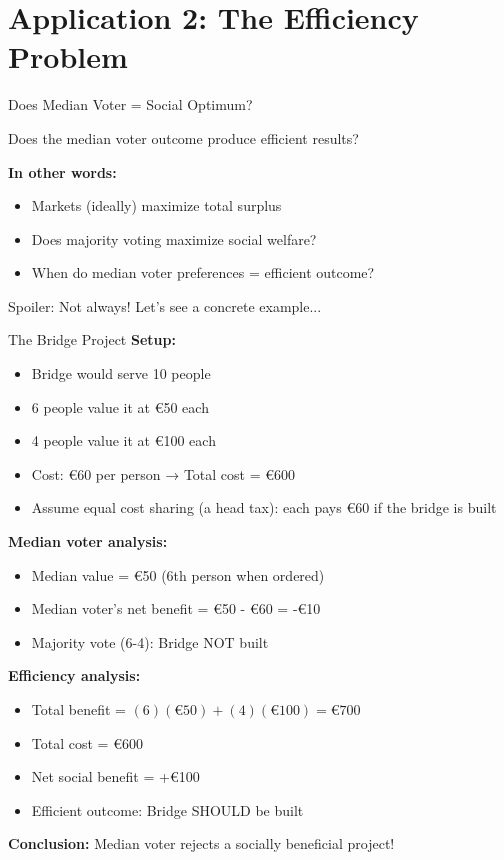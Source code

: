 \documentclass[10pt]{beamer}
\begin{document}
\section{Application 2: The Efficiency Problem}

\begin{frame}{Does Median Voter = Social Optimum?}
\begin{center}
\Large Does the median voter outcome produce \alert{efficient} results?
\end{center}




\textbf{In other words:}
\begin{itemize}
\item Markets (ideally) maximize total surplus
\item Does majority voting maximize social welfare?
\item When do median voter preferences = efficient outcome?
\end{itemize}




\alert{Spoiler:} Not always! Let's see a concrete example...
\end{frame}

\begin{frame}[allowframebreaks]{The Bridge Project}
\textbf{Setup:}
\begin{itemize}
\item Bridge would serve 10 people
\item 6 people value it at €50 each
\item 4 people value it at €100 each
\item Cost: €60 per person → Total cost = €600
\item Assume equal cost sharing (a head tax): each pays €60 if the bridge is built
\end{itemize}



\textbf{Median voter analysis:}
\begin{itemize}
\item Median value = €50 (6th person when ordered)
\item Median voter's net benefit = €50 - €60 = \alert{-€10}
\item \alert{Majority vote (6-4):} Bridge NOT built
\end{itemize}

\framebreak

\textbf{Efficiency analysis:}
\begin{itemize}
\item Total benefit = $(6)(€50) + (4)(€100) = €700$
\item Total cost = €600
\item Net social benefit = \alert{+€100}
\item \alert{Efficient outcome:} Bridge SHOULD be built
\end{itemize}



\alert{\textbf{Conclusion:}} Median voter rejects a socially beneficial project!
\end{frame}
\end{document}
